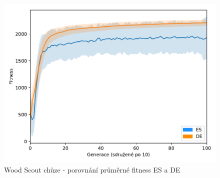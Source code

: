     \newpage
	\begin{figure}[h]\centering
		\includegraphics[width=\columnwidth]{../img/WoodMap/DEvsES/WCuttorWalkMem}
		\caption{ Wood Scout chůze - porovnání průměrné fitness ES a DE}
		\label{obr04:WalkESvsDE}
	\end{figure}
	

